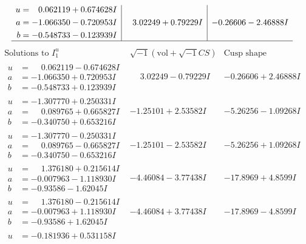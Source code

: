 \documentclass[1p]{elsarticle_modified}
\theoremstyle{definition}
\newcommand{\I}{\sqrt{-1}}
\begin{document}
$$\begin{array}{c|c|c}
\begin{aligned}
u &= \phantom{-}0.062119 + 0.674628 I \\
a &= -1.066350 - 0.720953 I \\
b &= -0.548733 - 0.123939 I\end{aligned}
 & \phantom{-}3.02249 + 0.79229 I & -0.26606 - 2.46888 I\\
 \hline 
 \end{array}$$\newpage$$\begin{array}{c|c|c}  
\text{Solutions to }I^u_{1}& \I (\text{vol} + \sqrt{-1}CS) & \text{Cusp shape}\\
 \hline 
\begin{aligned}
u &= \phantom{-}0.062119 - 0.674628 I \\
a &= -1.066350 + 0.720953 I \\
b &= -0.548733 + 0.123939 I\end{aligned}
 & \phantom{-}3.02249 - 0.79229 I & -0.26606 + 2.46888 I \\ \hline\begin{aligned}
u &= -1.307770 + 0.250331 I \\
a &= \phantom{-}0.089765 + 0.665827 I \\
b &= -0.340750 + 0.653216 I\end{aligned}
 & -1.25101 + 2.53582 I & -5.26256 - 1.09268 I \\ \hline\begin{aligned}
u &= -1.307770 - 0.250331 I \\
a &= \phantom{-}0.089765 - 0.665827 I \\
b &= -0.340750 - 0.653216 I\end{aligned}
 & -1.25101 - 2.53582 I & -5.26256 + 1.09268 I \\ \hline\begin{aligned}
u &= \phantom{-}1.376180 + 0.215614 I \\
a &= -0.007963 - 1.118930 I \\
b &= -0.93586 - 1.62045 I\end{aligned}
 & -4.46084 - 3.77438 I & -17.8969 + 4.8599 I \\ \hline\begin{aligned}
u &= \phantom{-}1.376180 - 0.215614 I \\
a &= -0.007963 + 1.118930 I \\
b &= -0.93586 + 1.62045 I\end{aligned}
 & -4.46084 + 3.77438 I & -17.8969 - 4.8599 I \\ \hline\begin{aligned}
u &= -0.181936 + 0.531158 I \\

\end{aligned}
\end{array}$$
\end{document}
